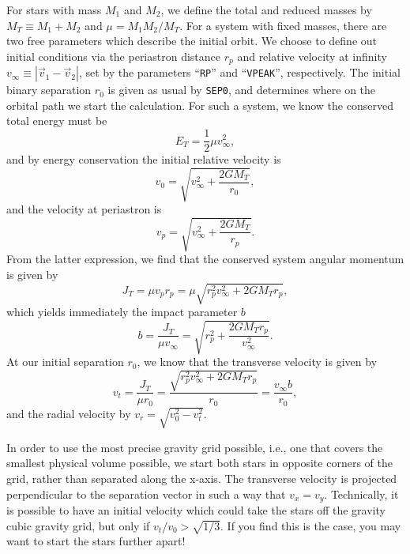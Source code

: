 For stars with mass $M_1$ and $M_2$, we define the total and reduced
masses by $M_T\equiv M_1+M_2$ and $\mu=M_1M_2/M_T$.  For a system with
fixed masses, there are two free parameters which describe the initial
orbit.  We choose to define out initial conditions via the periastron
distance $r_p$ and relative velocity at infinity  $v_{\infty}\equiv
|\vec{v}_1-\vec{v}_2|$, 
set by the parameters
``{\tt RP}'' and ``{\tt VPEAK}'', respectively.  The initial binary
separation $r_0$ is given as usual by {\tt SEP0}, and determines where on
the orbital path we start the calculation.
For such a system, we know the conserved total energy must be
\begin{equation}
E_T=\frac{1}{2}\mu v_{\infty}^2,
\end{equation}
and by energy conservation the initial relative velocity is
\begin{equation}
v_0=\sqrt{v_{\infty}^2+\frac{2GM_T}{r_0}},
\end{equation}
and the velocity at periastron is
\begin{equation}
v_p=\sqrt{v_{\infty}^2+\frac{2GM_T}{r_p}}.
\end{equation}
From the latter expression, we find that the conserved system angular momentum
is given by
\begin{equation}
J_T=\mu v_p r_p=\mu \sqrt{r_p^2 v_{\infty}^2+2GM_T r_p},
\end{equation}
which yields immediately the impact parameter $b$
\begin{equation}
b=\frac{J_T}{\mu v_{\infty}}=\sqrt{r_p^2+\frac{2GM_T r_p}{v_{\infty}^2}}.
\end{equation}
At our initial separation $r_0$, we know that the transverse velocity
is given by
\begin{equation}
v_t=\frac{J_T}{\mu r_0}=\frac{\sqrt{r_p^2 v_{\infty}^2+2GM_T
r_p}}{r_0}=\frac{v_{\infty}b}{r_0},
\end{equation}
and the radial velocity by $v_r=\sqrt{v_0^2-v_t^2}$.

In order to use the most precise gravity grid possible, i.e., one that
covers the smallest physical volume possible, we start both stars in
opposite corners of the grid, rather than separated along the x-axis.
The transverse velocity is projected perpendicular to the separation
vector in such a way that $v_x=v_y$.  Technically, it is possible to
have an initial velocity which could take the stars off the gravity
cubic gravity grid, but only if $v_t/v_0>\sqrt{1/3}$.  If you find
this is the case, you may want to start the stars further apart!

